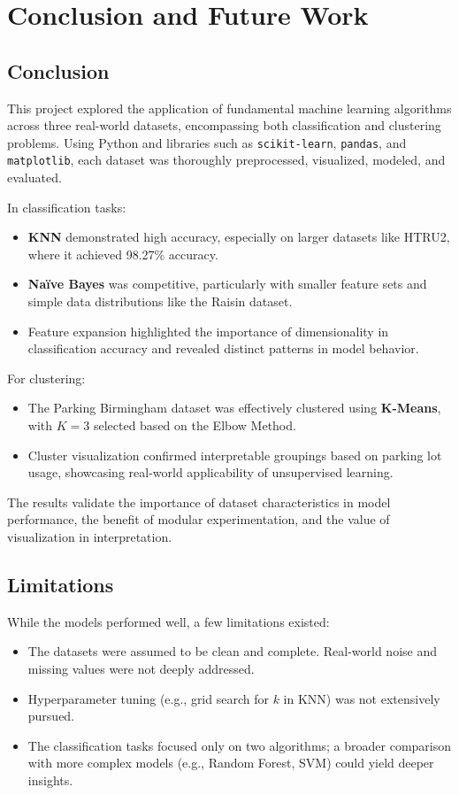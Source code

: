 \chapter{Conclusion and Future Work}
\label{ch:conclusion}

\section{Conclusion}

This project explored the application of fundamental machine learning algorithms across three real-world datasets, encompassing both classification and clustering problems. Using Python and libraries such as \texttt{scikit-learn}, \texttt{pandas}, and \texttt{matplotlib}, each dataset was thoroughly preprocessed, visualized, modeled, and evaluated.

In classification tasks:
\begin{itemize}
    \item \textbf{KNN} demonstrated high accuracy, especially on larger datasets like HTRU2, where it achieved 98.27\% accuracy.
    \item \textbf{Naïve Bayes} was competitive, particularly with smaller feature sets and simple data distributions like the Raisin dataset.
    \item Feature expansion highlighted the importance of dimensionality in classification accuracy and revealed distinct patterns in model behavior.
\end{itemize}

For clustering:
\begin{itemize}
    \item The Parking Birmingham dataset was effectively clustered using \textbf{K-Means}, with $K=3$ selected based on the Elbow Method.
    \item Cluster visualization confirmed interpretable groupings based on parking lot usage, showcasing real-world applicability of unsupervised learning.
\end{itemize}

The results validate the importance of dataset characteristics in model performance, the benefit of modular experimentation, and the value of visualization in interpretation.

\section{Limitations}

While the models performed well, a few limitations existed:
\begin{itemize}
    \item The datasets were assumed to be clean and complete. Real-world noise and missing values were not deeply addressed.
    \item Hyperparameter tuning (e.g., grid search for $k$ in KNN) was not extensively pursued.
    \item The classification tasks focused only on two algorithms; a broader comparison with more complex models (e.g., Random Forest, SVM) could yield deeper insights.
\end{itemize}

